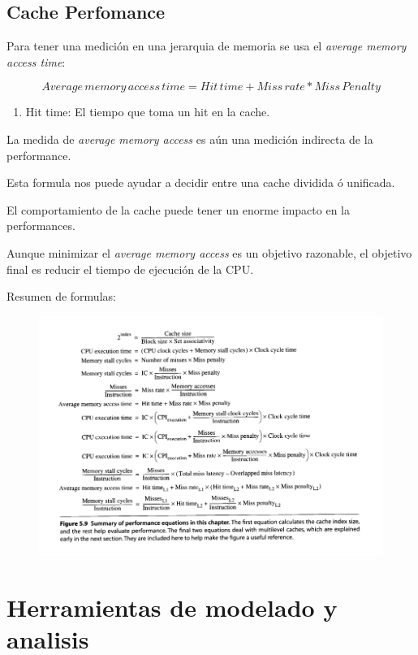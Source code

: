 \documentclass{article}
\begin{document}
\subsection{Cache Perfomance}

Para tener una medición en una jerarquia de memoria se usa el \textit{average memory access time}:

\begin{equation}
    Average\, memory\, access\, time = Hit\, time + Miss\, rate * Miss\, Penalty
\end{equation}

\begin{enumerate}
    \item Hit time: El tiempo que toma un hit en la cache.
\end{enumerate}


La medida de \textit{average memory access} es aún una medición indirecta de la performance.

Esta formula nos puede ayudar a decidir entre una cache dividida ó unificada.

El comportamiento de la cache puede tener un enorme impacto en la performances.

Aunque minimizar el \textit{average memory access} es un objetivo razonable, el objetivo final es reducir el tiempo de ejecución de la CPU.

Resumen de formulas:

\begin{figure}[h!]
    \includegraphics[width=\linewidth]{imagenes/ResumenPerformance.png}
\end{figure}


\section{Herramientas de modelado y analisis}
\end{document}
